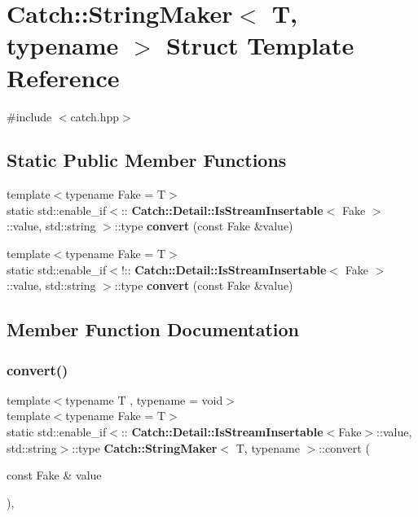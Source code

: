 \section{Catch\+::String\+Maker$<$ T, typename $>$ Struct Template Reference}
\label{struct_catch_1_1_string_maker}


{\ttfamily \#include $<$catch.\+hpp$>$}

\subsection*{Static Public Member Functions}
\begin{DoxyCompactItemize}
\item 
{\footnotesize template$<$typename Fake  = T$>$ }\\static std\+::enable\+\_\+if$<$\+::\textbf{ Catch\+::\+Detail\+::\+Is\+Stream\+Insertable}$<$ Fake $>$\+::value, std\+::string $>$\+::type \textbf{ convert} (const Fake \&value)
\item 
{\footnotesize template$<$typename Fake  = T$>$ }\\static std\+::enable\+\_\+if$<$!\+::\textbf{ Catch\+::\+Detail\+::\+Is\+Stream\+Insertable}$<$ Fake $>$\+::value, std\+::string $>$\+::type \textbf{ convert} (const Fake \&value)
\end{DoxyCompactItemize}


\subsection{Member Function Documentation}
\mbox{\label{struct_catch_1_1_string_maker_ab2c357e22b754802c4b1351257103eb6}} 
\subsubsection{convert()\hspace{0.1cm}{\footnotesize\ttfamily [1/2]}}
{\footnotesize\ttfamily template$<$typename T , typename  = void$>$ \\
template$<$typename Fake  = T$>$ \\
static std\+::enable\+\_\+if$<$\+::\textbf{ Catch\+::\+Detail\+::\+Is\+Stream\+Insertable}$<$Fake$>$\+::value, std\+::string$>$\+::type \textbf{ Catch\+::\+String\+Maker}$<$ T, typename $>$\+::convert (\begin{DoxyParamCaption}\item[{const Fake \&}]{value }\end{DoxyParamCaption})\hspace{0.3cm}{\ttfamily [inline]}, {\ttfamily [static]}}

